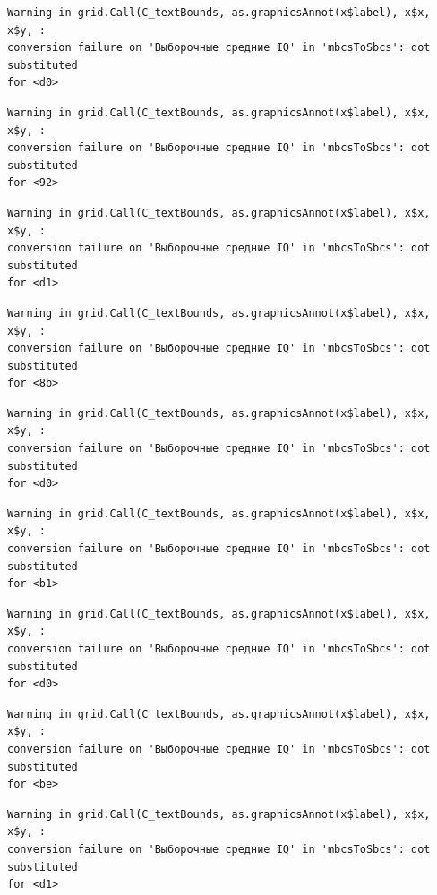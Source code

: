 \documentclass[
  letterpaper,
]{scrbook}
\theoremstyle{definition}
\theoremstyle{remark}
\begin{document}
\begin{verbatim}
Warning in grid.Call(C_textBounds, as.graphicsAnnot(x$label), x$x, x$y, :
conversion failure on 'Выборочные средние IQ' in 'mbcsToSbcs': dot substituted
for <d0>
\end{verbatim}

\begin{verbatim}
Warning in grid.Call(C_textBounds, as.graphicsAnnot(x$label), x$x, x$y, :
conversion failure on 'Выборочные средние IQ' in 'mbcsToSbcs': dot substituted
for <92>
\end{verbatim}

\begin{verbatim}
Warning in grid.Call(C_textBounds, as.graphicsAnnot(x$label), x$x, x$y, :
conversion failure on 'Выборочные средние IQ' in 'mbcsToSbcs': dot substituted
for <d1>
\end{verbatim}

\begin{verbatim}
Warning in grid.Call(C_textBounds, as.graphicsAnnot(x$label), x$x, x$y, :
conversion failure on 'Выборочные средние IQ' in 'mbcsToSbcs': dot substituted
for <8b>
\end{verbatim}

\begin{verbatim}
Warning in grid.Call(C_textBounds, as.graphicsAnnot(x$label), x$x, x$y, :
conversion failure on 'Выборочные средние IQ' in 'mbcsToSbcs': dot substituted
for <d0>
\end{verbatim}

\begin{verbatim}
Warning in grid.Call(C_textBounds, as.graphicsAnnot(x$label), x$x, x$y, :
conversion failure on 'Выборочные средние IQ' in 'mbcsToSbcs': dot substituted
for <b1>
\end{verbatim}

\begin{verbatim}
Warning in grid.Call(C_textBounds, as.graphicsAnnot(x$label), x$x, x$y, :
conversion failure on 'Выборочные средние IQ' in 'mbcsToSbcs': dot substituted
for <d0>
\end{verbatim}

\begin{verbatim}
Warning in grid.Call(C_textBounds, as.graphicsAnnot(x$label), x$x, x$y, :
conversion failure on 'Выборочные средние IQ' in 'mbcsToSbcs': dot substituted
for <be>
\end{verbatim}

\begin{verbatim}
Warning in grid.Call(C_textBounds, as.graphicsAnnot(x$label), x$x, x$y, :
conversion failure on 'Выборочные средние IQ' in 'mbcsToSbcs': dot substituted
for <d1>
\end{verbatim}
\end{document}
